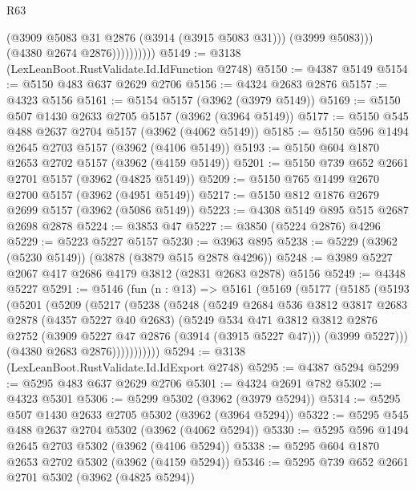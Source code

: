 \begin{lexlean}{R63}
\begin{coremodule}
                          (@3909 @5083 @31 @2876 (@3914 (@3915 @5083 @31)))
                          (@3999 @5083)))
                      (@4380 @2674 @2876))))))))))
@5149 := @3138 (LexLeanBoot.RustValidate.Id.IdFunction @2748)
@5150 := @4387 @5149
@5154 := @5150 @483 @637 @2629 @2706
@5156 := @4324 @2683 @2876
@5157 := @4323 @5156
@5161 := @5154 @5157 (@3962 (@3979 @5149))
@5169 := @5150 @507 @1430 @2633 @2705 @5157 (@3962 (@3964 @5149))
@5177 := @5150 @545 @488 @2637 @2704 @5157 (@3962 (@4062 @5149))
@5185 := @5150 @596 @1494 @2645 @2703 @5157 (@3962 (@4106 @5149))
@5193 := @5150 @604 @1870 @2653 @2702 @5157 (@3962 (@4159 @5149))
@5201 := @5150 @739 @652 @2661 @2701 @5157 (@3962 (@4825 @5149))
@5209 := @5150 @765 @1499 @2670 @2700 @5157 (@3962 (@4951 @5149))
@5217 := @5150 @812 @1876 @2679 @2699 @5157 (@3962 (@5086 @5149))
@5223 := @4308 @5149 @895 @515 @2687 @2698 @2878
@5224 := @3853 @47
@5227 := @3850 (@5224 @2876) @4296
@5229 := @5223 @5227 @5157
@5230 := @3963 @895
@5238 := @5229 (@3962 (@5230 @5149)) (@3878 (@3879 @515 @2878 @4296))
@5248 := @3989 @5227 @2067 @417 @2686 @4179 @3812 (@2831 @2683 @2878) @5156
@5249 := @4348 @5227
@5291 := @5146
    (fun (n : @13) =>
    @5161
      (@5169
        (@5177
          (@5185
            (@5193
              (@5201
                (@5209
                  (@5217
                    (@5238
                      (@5248
                        (@5249
                          @2684
                          @536
                          @3812
                          @3817
                          @2683
                          @2878
                          (@4357 @5227 @40 @2683)
                          (@5249
                            @534
                            @471
                            @3812
                            @3812
                            @2876
                            @2752
                            (@3909 @5227 @47 @2876 (@3914 (@3915 @5227 @47)))
                            (@3999 @5227)))
                        (@4380 @2683 @2876)))))))))))
@5294 := @3138 (LexLeanBoot.RustValidate.Id.IdExport @2748)
@5295 := @4387 @5294
@5299 := @5295 @483 @637 @2629 @2706
@5301 := @4324 @2691 @782
@5302 := @4323 @5301
@5306 := @5299 @5302 (@3962 (@3979 @5294))
@5314 := @5295 @507 @1430 @2633 @2705 @5302 (@3962 (@3964 @5294))
@5322 := @5295 @545 @488 @2637 @2704 @5302 (@3962 (@4062 @5294))
@5330 := @5295 @596 @1494 @2645 @2703 @5302 (@3962 (@4106 @5294))
@5338 := @5295 @604 @1870 @2653 @2702 @5302 (@3962 (@4159 @5294))
@5346 := @5295 @739 @652 @2661 @2701 @5302 (@3962 (@4825 @5294))

\end{coremodule}
\end{lexlean}
